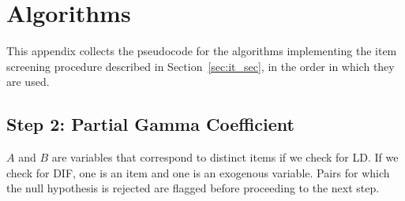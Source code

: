 \section*{Algorithms}

This appendix collects the pseudocode for the algorithms implementing the item screening procedure described in Section~\ref{sec:it_sec}, in the order in which they are used.

\subsection*{Step 2: Partial Gamma Coefficient}
$A$ and $B$ are variables that correspond to distinct items if we check for LD. If we check for DIF, one is an item and one is an exogenous variable. Pairs for which the null hypothesis is rejected are flagged before proceeding to the next step.

